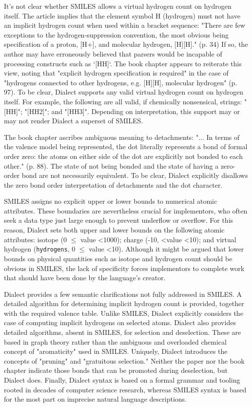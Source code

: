 \documentclass{article}
\def\ttt{\texttt}
\begin{document}
It's not clear whether SMILES allows a virtual hydrogen count on hydrogen itself. The article implies that the element symbol H (hydrogen) must not have an implicit hydrogen count when used within a bracket sequence: "There are few exceptions to the hydrogen-suppression convention, the most obvious being specification of a proton, [H+], and molecular hydrogen, [H][H]." (p. 34) If so, the author may have erroneously believed that parsers would be incapable of processing constructs such as `[HH]`. The book chapter appears to reiterate this view, noting that "explicit hydrogen specification is required" in the case of "hydrogens connected to other hydrogens, e.g. [H][H], molecular hydrogen" (p. 97). To be clear, Dialect supports any valid virtual hydrogen count on hydrogen itself. For example, the following are all valid, if chemically nonsensical, strings: "[HH]"; "[HH2]"; and "[HH3]". Depending on interpretation, this support may or may not render Dialect a superset of SMILES.

The book chapter ascribes ambiguous meaning to detachments: "... In terms of the valence model being represented, the dot literally represents a bond of formal order zero: the atoms on either side of the dot are explicitly not bonded to each other." (p. 88). The state of not being bonded and the state of having a zero-order bond are not necessarily equivalent.\cite{clark:2011} To be clear, Dialect explicitly disallows the zero bond order interpretation of detachments and the dot character.

SMILES assigns no explicit upper or lower bounds to numerical atomic attributes. These boundaries are nevertheless crucial for implementors, who often seek a data type just large enough to prevent underflow or overflow. For this reason, Dialect sets both upper and lower bounds on the following atomic attributes: isotope (0 $\leq$ value \textless 1000); charge (-10, \textless value \textless 10); and virtual hydrogen (\ttt{hydrogens}, 0 $\leq$ value \textless 10). Although it might be argued that lower bounds on physical quantities such as isotope and hydrogen count should be obvious in SMILES, the lack of specificity forces implementors to complete work that should have been done by the language's creator.

Dialect provides a few semantic clarifications not fully addressed in SMILES. A detailed algorithm for determining implicit hydrogen count is provided, together with the required valence table. Unlike SMILES, Dialect explicitly considers the case of computing implicit hydrogens on selected atoms. Dialect also provides detailed algorithms, absent in SMILES, for selection and deselection. These are based in graph theory rather than the ambiguous and overloaded chemical concept of "aromaticity" used in SMILES. Uniquely, Dialect introduces the concepts of "pruning" and "gratuitous selection." Neither the paper nor the book chapter indicate those bonds that can be promoted during deselection, but Dialect does. Finally, Dialect syntax is based on a formal grammar and tooling rooted in decades of computer science research, whereas SMILES syntax is based for the most part on imprecise natural language descriptions.
\end{document}

